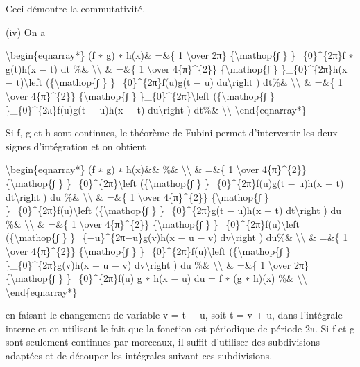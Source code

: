 \documentclass[]{article}
\begin{document}
Ceci démontre la commutativité.

(iv) On a

\textbackslash{}begin\{eqnarray*\} (f ∗ g) ∗ h(x)\& =\&\{ 1
\textbackslash{}over 2π\} \{\textbackslash{}mathop\{∫ \}
\}\_\{0\}\^{}\{2π\}f ∗ g(t)h(x − t) dt \%\&
\textbackslash{}\textbackslash{} \& =\&\{ 1 \textbackslash{}over
4\{π\}\^{}\{2\}\} \{\textbackslash{}mathop\{∫ \} \}\_\{0\}\^{}\{2π\}h(x
− t)\textbackslash{}left (\{\textbackslash{}mathop\{∫ \}
\}\_\{0\}\^{}\{2π\}f(u)g(t − u) du\textbackslash{}right ) dt\%\&
\textbackslash{}\textbackslash{} \& =\&\{ 1 \textbackslash{}over
4\{π\}\^{}\{2\}\} \{\textbackslash{}mathop\{∫ \}
\}\_\{0\}\^{}\{2π\}\textbackslash{}left (\{\textbackslash{}mathop\{∫ \}
\}\_\{0\}\^{}\{2π\}f(u)g(t − u)h(x − t) du\textbackslash{}right ) dt\%\&
\textbackslash{}\textbackslash{} \textbackslash{}end\{eqnarray*\}

Si f, g et h sont continues, le théorème de Fubini permet d'intervertir
les deux signes d'intégration et on obtient

\textbackslash{}begin\{eqnarray*\} (f ∗ g) ∗ h(x)\&\& \%\&
\textbackslash{}\textbackslash{} \& =\&\{ 1 \textbackslash{}over
4\{π\}\^{}\{2\}\} \{\textbackslash{}mathop\{∫ \}
\}\_\{0\}\^{}\{2π\}\textbackslash{}left (\{\textbackslash{}mathop\{∫ \}
\}\_\{0\}\^{}\{2π\}f(u)g(t − u)h(x − t) dt\textbackslash{}right ) du
\%\& \textbackslash{}\textbackslash{} \& =\&\{ 1 \textbackslash{}over
4\{π\}\^{}\{2\}\} \{\textbackslash{}mathop\{∫ \}
\}\_\{0\}\^{}\{2π\}f(u)\textbackslash{}left (\{\textbackslash{}mathop\{∫
\} \}\_\{0\}\^{}\{2π\}g(t − u)h(x − t) dt\textbackslash{}right ) du \%\&
\textbackslash{}\textbackslash{} \& =\&\{ 1 \textbackslash{}over
4\{π\}\^{}\{2\}\} \{\textbackslash{}mathop\{∫ \}
\}\_\{0\}\^{}\{2π\}f(u)\textbackslash{}left (\{\textbackslash{}mathop\{∫
\} \}\_\{−u\}\^{}\{2π−u\}g(v)h(x − u − v) dv\textbackslash{}right )
du\%\& \textbackslash{}\textbackslash{} \& =\&\{ 1 \textbackslash{}over
4\{π\}\^{}\{2\}\} \{\textbackslash{}mathop\{∫ \}
\}\_\{0\}\^{}\{2π\}f(u)\textbackslash{}left (\{\textbackslash{}mathop\{∫
\} \}\_\{0\}\^{}\{2π\}g(v)h(x − u − v) dv\textbackslash{}right ) du \%\&
\textbackslash{}\textbackslash{} \& =\&\{ 1 \textbackslash{}over 2π\}
\{\textbackslash{}mathop\{∫ \} \}\_\{0\}\^{}\{2π\}f(u) g ∗ h(x − u) du =
f ∗ (g ∗ h)(x) \%\& \textbackslash{}\textbackslash{}
\textbackslash{}end\{eqnarray*\}

en faisant le changement de variable v = t − u, soit t = v + u, dans
l'intégrale interne et en utilisant le fait que la fonction est
périodique de période 2π. Si f et g sont seulement continues par
morceaux, il suffit d'utiliser des subdivisions adaptées et de découper
les intégrales suivant ces subdivisions.
\end{document}
